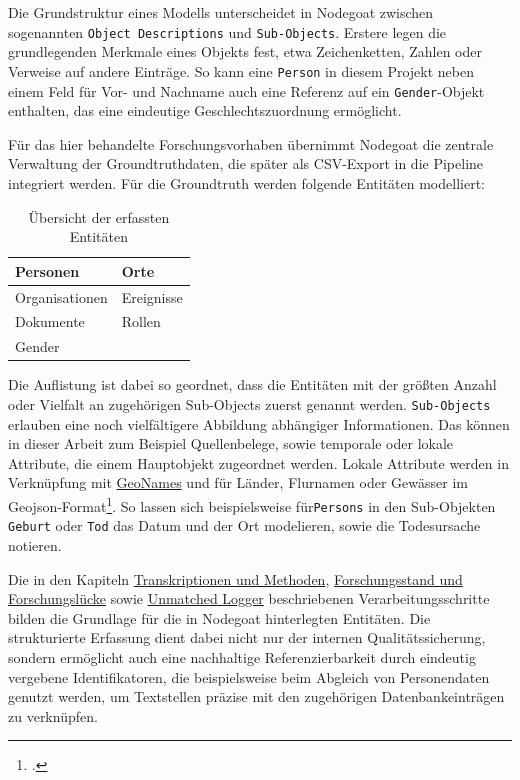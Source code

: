 \documentclass[12pt, a4paper, ngerman, bidi=default]{article}
\let\cite\footcite
\newcommand{\code}[1]{\colorbox{VeryLightGray}{\texttt{#1}}} %
\begin{document}
Die Grundstruktur eines Modells unterscheidet in Nodegoat zwischen sogenannten \code{Object Descriptions} und \code{Sub-Objects}. 
Erstere legen die grundlegenden Merkmale eines Objekts fest, etwa Zeichenketten, Zahlen oder Verweise auf andere Einträge. 
So kann eine \code{Person} in diesem Projekt neben einem Feld für Vor- und Nachname auch eine Referenz auf ein \code{Gender}-Objekt enthalten, 
das eine eindeutige Geschlechtszuordnung ermöglicht.

Für das hier behandelte Forschungsvorhaben übernimmt Nodegoat die zentrale Verwaltung der Groundtruthdaten, die später als CSV-Export in die Pipeline integriert werden. 
Für die Groundtruth werden folgende Entitäten modelliert:

\begin{table}[h]
  \renewcommand{\arraystretch}{1.5}
  \centering
  \begin{tabular}{|p{}|p{}|}
    \hline
    Personen & Orte \\ \hline
    Organisationen & Ereignisse \\ \hline
    Dokumente & Rollen \\ \hline
    Gender & \\ \hline
  \end{tabular}
  \caption{\small Übersicht der erfassten Entitäten}
\end{table}

Die Auflistung ist dabei so geordnet, dass die Entitäten mit der größten Anzahl oder Vielfalt an zugehörigen Sub-Objects zuerst genannt werden. \code{Sub-Objects} erlauben eine
noch vielfältigere Abbildung abhängiger Informationen. Das können in dieser Arbeit zum Beispiel Quellenbelege, sowie temporale oder lokale Attribute, die einem Hauptobjekt zugeordnet werden. Lokale Attribute 
werden in Verknüpfung mit \hyperref[subsubsec:geonames]{GeoNames} und für Länder, Flurnamen oder Gewässer im Geojson-Format\cite[Weiterführend:][]{thomson_geographic_2017}. So lassen sich beispielsweise für\code{Persons}
in den Sub-Objekten \code{Geburt} oder \code{Tod} das Datum und der Ort modelieren, sowie die Todesursache notieren.

Die in den Kapiteln \hyperref[section:Transkriptionen_Methoden]{Transkriptionen und Methoden}, \hyperref[subsec:forschungsstand]{Forschungsstand und Forschungslücke} 
sowie \hyperref[subsec:unmatched_logger]{Unmatched Logger} beschriebenen Verarbeitungsschritte bilden die Grundlage für die in Nodegoat hinterlegten Entitäten.
Die strukturierte Erfassung dient dabei nicht nur der internen Qualitätssicherung, sondern ermöglicht auch eine nachhaltige Referenzierbarkeit durch eindeutig 
vergebene Identifikatoren, die beispielsweise beim Abgleich von Personendaten genutzt werden, um Textstellen präzise mit den zugehörigen Datenbankeinträgen zu verknüpfen.
\end{document}
